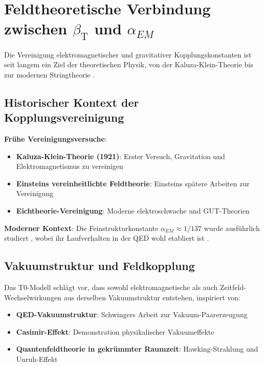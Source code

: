 \documentclass[12pt,a4paper]{article}
\newcommand{\betaT}{\beta_{\text{T}}}
\begin{document}
	\section{Feldtheoretische Verbindung zwischen $\betaT$ und $\alpha_{EM}$}
	\label{sec:beta_alpha_connection}
	
	Die Vereinigung elektromagnetischer und gravitativer Kopplungskonstanten ist seit langem ein Ziel der theoretischen Physik, von der Kaluza-Klein-Theorie \citep{kaluza1921,klein1926} bis zur modernen Stringtheorie \citep{green1987,polchinski1998}.
	
	\subsection{Historischer Kontext der Kopplungsvereinigung}
	\label{subsec:coupling_unification_history}
	
	\textbf{Frühe Vereinigungsversuche}:
	\begin{itemize}
		\item \textbf{Kaluza-Klein-Theorie (1921)}: Erster Versuch, Gravitation und Elektromagnetismus zu vereinigen \citep{kaluza1921,klein1926}
		\item \textbf{Einsteins vereinheitlichte Feldtheorie}: Einsteins spätere Arbeiten zur Vereinigung \citep{einstein1955}
		\item \textbf{Eichtheorie-Vereinigung}: Moderne elektroschwache \citep{weinberg1967,salam1968} und GUT-Theorien \citep{georgi1974}
	\end{itemize}
	
	\textbf{Moderner Kontext}:
	Die Feinstrukturkonstante $\alpha_{EM} \approx 1/137$ wurde ausführlich studiert \citep{sommerfeld1916,feynman1985}, wobei ihr Laufverhalten in der QED wohl etabliert ist \citep{peskin1995}.
	
	\subsection{Vakuumstruktur und Feldkopplung}
	\label{subsec:vacuum_structure}
	
	Das T0-Modell schlägt vor, dass sowohl elektromagnetische als auch Zeitfeld-Wechselwirkungen aus derselben Vakuumstruktur entstehen, inspiriert von:
	\begin{itemize}
		\item \textbf{QED-Vakuumstruktur}: Schwingers Arbeit zur Vakuum-Paarerzeugung \citep{schwinger1951}
		\item \textbf{Casimir-Effekt}: Demonstration physikalischer Vakuumeffekte \citep{casimir1948}
		\item \textbf{Quantenfeldtheorie in gekrümmter Raumzeit}: Hawking-Strahlung \citep{hawking1975} und Unruh-Effekt \citep{unruh1976}
	\end{itemize}
	
\end{document}
